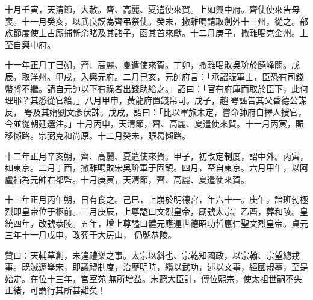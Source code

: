 \begin{pinyinscope}
 十月壬寅，天清節，大赦。齊、高麗、夏遣使來賀。上如興中府。齊使使來告母喪。十一月癸亥，以武良謨為齊弔祭使。癸未，撒離喝請取劍外十三州，從之。部族節度使土古廝捕斬余睹及其諸子，函其首來獻。十二月庚子，撒離喝克金州。上至自興中府。



 十一年正月丁巳朔，齊、高麗、夏遣使來賀。丁卯，撒離喝敗吳玠於饒峰關。戊辰，取洋州。甲戌，入興元府。二月己亥，元帥府言：「承詔賑軍士，臣恐有司錢幣將不繼。請自元帥以下有祿者出錢助給之。」詔曰：「官有府庫而取於臣下，此何理耶？其悉從官給。」八月甲申，黃龍府置錢帛司。戊子，趙咢誣告其父昏德公謀反，咢及其婿劉文彥伏誅。戊戌，詔曰：「比以軍旅未定，嘗命帥府自擇人授官，今並從朝廷選注。」十月丙申，天清節，齊、高麗、夏遣使來賀。十一月丙寅，賑移懶路。宗弼克和尚原。十二月癸未，賑曷懶路。



 十二年正月辛亥朔，齊、高麗、夏遣使來賀。甲子，初改定制度，詔中外。丙寅，如東京。二月丁酉，撒離喝敗宋吳玠軍于固鎮。四月，至自東京。六月甲午，以阿盧補為元帥右都監。十月庚寅，天清節，齊、高麗、夏遣使來賀。



 十三年正月丙午朔，日有食之。己巳，上崩於明德宮，年六十一。庚午，諳班勃極烈即皇帝位于柩前。三月庚辰，上尊謚曰文烈皇帝，廟號太宗。乙酉，葬和陵。皇統四年，改號恭陵。五年，增上尊謚曰體元應運世德昭功哲惠仁聖文烈皇帝。貞元三年十一月戊申，改葬于大房山，
 仍號恭陵。



 贊曰：天輔草創，未遑禮樂之事。太宗以斜也、宗乾知國政，以宗翰、宗望總戎事。既滅遼舉宋，即議禮制度，治歷明時，纘以武功，述以文事，經國規摹，至是始定。在位十三年，宮室苑無所增益。末聽大臣計，傳位熙宗，使太祖世嗣不失正緒，可謂行其所甚難矣！



\end{pinyinscope}